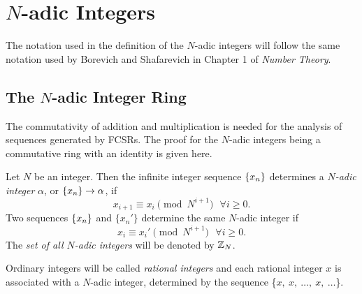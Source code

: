 \section{$N$-adic Integers}
\par The notation used in the definition of the $N$-adic integers will follow
the same notation used by Borevich and Shafarevich in Chapter 1 of
{\em Number Theory}.

\subsection{The $N$-adic Integer Ring}
\par The commutativity of addition and multiplication is needed for
the analysis of sequences generated by FCSRs. The proof for the $N$-adic
integers being a commutative ring with an identity is given here.
  
\begin{definition}
\label{def:N-adic}
  Let $N$ be an integer. Then the infinite integer sequence $\{x_n\}$
  determines a {\em $N$-adic integer} $\alpha$, or $\{x_n\} \rightarrow \alpha$, if
\begin{equation} \label{eq:seq}
  x_{i+1} \equiv x_i \pmod{N^{i+1}} \ \ \ \forall i \geq 0.
\end{equation}
  Two sequences $\{x_n\}$ and $\{x_n'\}$ determine the same $N$-adic integer
  if 
\begin{equation} \label{eq:equiv}
  x_i \equiv x_i' \pmod{N^{i+1}}\ \ \ \forall i \geq 0.
\end{equation}
  The {\em set of all $N$-adic integers} will be denoted by $\mathbb{Z}_N$.
\end{definition}

\par Ordinary integers will be called {\em rational integers} and each
rational integer $x$ is associated with a $N$-adic integer, determined
by the sequence \{$x,\ x, \ \dots, \ x,\ \dots$\}.
	
